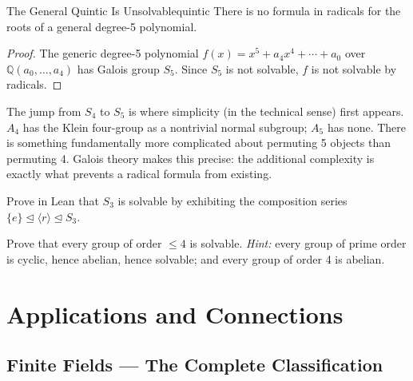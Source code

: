\documentclass[11pt, a4paper, oneside]{book}
\newcommand{\Q}{\mathbb{Q}}
\newcommand{\normal}{\trianglelefteq}
\newcounter{exercise}[chapter]
\begin{document}
\begin{thm}{The General Quintic Is Unsolvable}{quintic}
There is no formula in radicals for the roots of a general degree-5
polynomial.
\end{thm}

\begin{proof}
The generic degree-5 polynomial $f(x) = x^5 + a_4x^4 + \cdots + a_0$
over $\Q(a_0, \ldots, a_4)$ has Galois group $S_5$. Since $S_5$ is not
solvable, $f$ is not solvable by radicals.
\end{proof}

\begin{historical}[title={The Punchline}]
The jump from $S_4$ to $S_5$ is where simplicity (in the technical sense)
first appears. $A_4$ has the Klein four-group as a nontrivial normal subgroup;
$A_5$ has none. There is something fundamentally more complicated about
permuting 5 objects than permuting 4. Galois theory makes this precise:
the additional complexity is exactly what prevents a radical formula from
existing.
\end{historical}

\begin{exercisebox}[title={Exercise 10.1}]
Prove in Lean that $S_3$ is solvable by exhibiting the composition series
$\{e\} \normal \langle r \rangle \normal S_3$.
\end{exercisebox}

\begin{exercisebox}[title={Exercise 10.2}]
Prove that every group of order $\leq 4$ is solvable. \emph{Hint:} every
group of prime order is cyclic, hence abelian, hence solvable; and every
group of order 4 is abelian.
\end{exercisebox}

\part{Applications and Connections}

\chapter{Finite Fields --- The Complete Classification}
\end{document}

